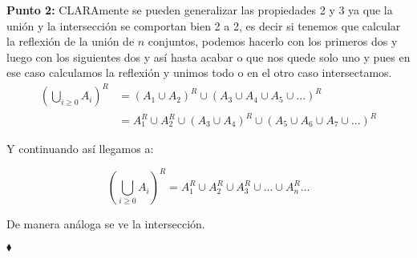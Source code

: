 \textbf{Punto 2:} CLARAmente se pueden generalizar las propiedades 2 y 3 ya que la unión y la intersección se comportan bien 2 a 2, es decir si tenemos que calcular la reflexión de la unión de $n$ conjuntos, podemos hacerlo con los primeros dos y luego con los siguientes dos y así hasta acabar o que nos quede solo uno y pues en ese caso calculamos la reflexión y unimos todo o en el otro caso intersectamos.\\

\begin{align*}
\displaystyle\left(\bigcup_{i \geq 0} A_i\right)^R&=(A_1\cup A_2)^R\cup (A_3\cup A_4\cup A_5\cup ...)^R\\
&=A_1^R\cup A_2^R\cup (A_3\cup A_4)^R\cup (A_5\cup A_6\cup A_7\cup ...)^R
\end{align*}

Y continuando así llegamos a:

$$\displaystyle\left(\bigcup_{i \geq 0} A_i\right)^R=A_1^R\cup A_2^R\cup A_3^R\cup...\cup A_n^R...$$

De manera análoga se ve la intersección.

\hfill $\blacklozenge$


